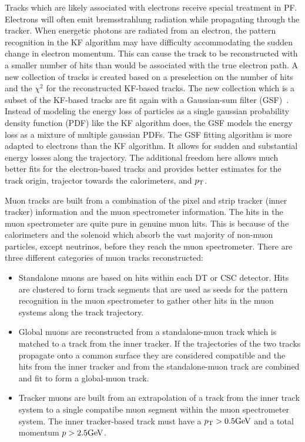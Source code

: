 Tracks which are likely associated with electrons receive special treatment in PF. Electrons
will often emit bremsstrahlung radiation while propagating through the tracker.
When energetic photons are radiated from an electron, the pattern recognition in the KF algorithm
may have difficulty accommodating the sudden change in electron momentum. This can cause the track to 
be reconstructed with a smaller number of hits than would be associated with the true electron
path. A new collection of tracks is created based on a preselection on the number of hits and 
the $\chi^2$ for the reconstructed KF-based tracks. The new collection which is a subset of the
KF-based tracks are fit again with a Gaussian-sum filter (GSF)~\cite{gsf_electrons}. Instead of
modeling the energy loss of particles as a single gaussian probability density function (PDF) like the KF
algorithm does, the GSF models the energy loss as a mixture of multiple gaussian PDFs. 
The GSF fitting algorithm is more adapted to electrons than the KF algorithm.
It allows for sudden and substantial energy losses along the trajectory. The
additional freedom here allows much better fits for the electron-based tracks and provides
better estimates for the track origin, trajector towards the calorimeters, and $p_\mathrm{T}$.

Muon tracks are built from a combination of the pixel and strip tracker (inner tracker) information and the
muon spectrometer information. 
The hits in the muon spectrometer are quite pure in genuine muon hits. This is because of the
calorimeters and the solenoid which absorb the vast majority of non-muon particles, except neutrinos, 
before they reach the muon spectrometer. There are three different categories of muon tracks
reconstructed:
\begin{itemize}
\item Standalone muons are based on hits within each DT or CSC detector. Hits are clustered to form 
track segments that are used as seeds for the pattern recognition in the muon spectrometer to gather
other hits in the muon systems along the track trajectory.
\item Global muons are reconstructed from a standalone-muon track which is matched to a track 
from the inner tracker. If the trajectories of the two tracks propagate onto a common surface 
they are considered compatible and the hits from the inner tracker and from the standalone-muon 
track are combined and fit to form a global-muon track.
\item Tracker muons are built from an extrapolation of a track from the inner track system to a
single compatibe muon segment within the muon spectrometer system. The inner tracker-based track must have 
a $p_\mathrm{T} > 0.5\mathrm{GeV}$ and a total momentum $p > 2.5\mathrm{GeV}$.
\end{itemize}

